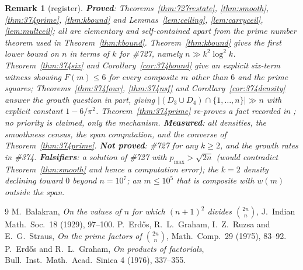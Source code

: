 \documentclass[11pt]{article}
\newtheorem{remark}[theorem]{Remark}
\begin{document}
\begin{remark}[register]
\textbf{Proved}: Theorems~\ref{thm:727restate}, \ref{thm:smooth}, \ref{thm:374prime},
\ref{thm:kbound} and Lemmas~\ref{lem:ceiling}, \ref{lem:carryceil}, \ref{lem:multceil};
all are elementary and self-contained apart from the prime number theorem used in
Theorem~\ref{thm:kbound}.  Theorem~\ref{thm:kbound} gives the first lower bound on $n$ in
terms of $k$ for \#727, namely $n\gg k^{2}\log^{2}k$.  Theorem~\ref{thm:374six} and
Corollary~\ref{cor:374bound} give an explicit six-term witness showing $F(m)\le6$ for every
composite $m$ other than $6$ and the prime squares; Theorems~\ref{thm:374four},
\ref{thm:374nsf} and Corollary~\ref{cor:374density} answer the growth question in part,
giving $|(D_3\cup D_4)\cap\{1,\dots,n\}|\gg n$ with explicit constant $1-6/\pi^{2}$.  Theorem~\ref{thm:374prime}
re-proves a fact recorded in \cite{ErGr76}; no priority is claimed, only the mechanism.
\textbf{Measured}: all densities, the smoothness census, the span computation, and the
converse of Theorem~\ref{thm:374prime}.  \textbf{Not proved}: \#727 for any $k\ge2$, and
the growth rates in \#374.  \textbf{Falsifiers}: a solution of \#727 with
$p_{\max}>\sqrt{2n}$ (would contradict Theorem~\ref{thm:smooth} and hence a computation
error); the $k=2$ density declining toward $0$ beyond $n=10^7$; an $m\le10^5$ that is
composite with $w(m)$ outside the span.
\end{remark}

\begin{thebibliography}{9}
 M.\ Balakran, \emph{On the values of $n$ for which $(n+1)^2$ divides
$\binom{2n}{n}$}, J.\ Indian Math.\ Soc.\ 18 (1929), 97--100.
 P.\ Erd\H{o}s, R.\ L.\ Graham, I.\ Z.\ Ruzsa and E.\ G.\ Straus,
\emph{On the prime factors of $\binom{2n}{n}$}, Math.\ Comp.\ 29 (1975), 83--92.
 P.\ Erd\H{o}s and R.\ L.\ Graham, \emph{On products of factorials},
Bull.\ Inst.\ Math.\ Acad.\ Sinica 4 (1976), 337--355.
\end{thebibliography}
\end{document}
